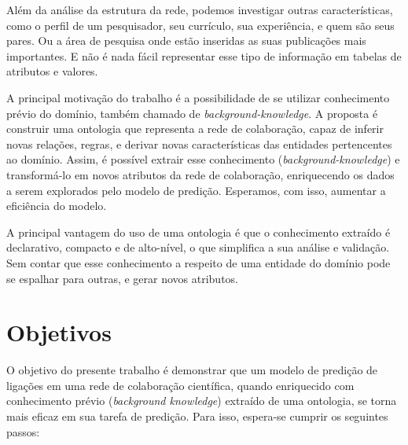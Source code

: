 Além da análise da estrutura da rede, podemos investigar outras características, como o perfil de um pesquisador, seu currículo, sua experiência, e quem são seus pares. Ou a área de pesquisa onde estão inseridas as suas publicações mais importantes. E não é nada fácil representar esse tipo de informação em tabelas de atributos e valores.

A principal motivação do trabalho é a possibilidade de se utilizar conhecimento prévio do domínio, também chamado de \textit{background-knowledge}. A proposta é construir uma ontologia que representa a rede de colaboração, capaz de inferir novas relações, regras, e derivar novas características das entidades pertencentes ao domínio. Assim, é possível extrair esse conhecimento (\textit{background-knowledge}) e transformá-lo em novos atributos da rede de colaboração, enriquecendo os dados a serem explorados pelo modelo de predição. Esperamos, com isso, aumentar a eficiência do modelo.

 A principal vantagem do uso de uma ontologia é que o conhecimento extraído é declarativo, compacto e de alto-nível, o que simplifica a sua análise e validação. Sem contar que esse conhecimento a respeito de uma entidade do domínio pode se espalhar para outras, e gerar novos atributos. %


\section{Objetivos}
\label{sec:objetivos}

O objetivo do presente trabalho é demonstrar que um modelo de predição de ligações em uma rede de colaboração científica, quando enriquecido com conhecimento prévio (\textit{background knowledge}) extraído de uma ontologia, se torna mais eficaz em sua tarefa de predição.
Para isso, espera-se cumprir os seguintes passos:

